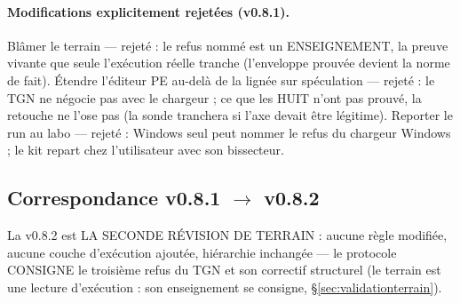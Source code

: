 \paragraph{Modifications explicitement rejetées (v0.8.1).} Blâmer le terrain —
rejeté : le refus nommé est un ENSEIGNEMENT, la preuve vivante que seule
l'exécution réelle tranche (l'enveloppe prouvée devient la norme de fait).
Étendre l'éditeur PE au-delà de la lignée sur spéculation — rejeté : le TGN ne
négocie pas avec le chargeur ; ce que les HUIT n'ont pas prouvé, la retouche ne
l'ose pas (la sonde tranchera si l'axe devait être légitime). Reporter le run au
labo — rejeté : Windows seul peut nommer le refus du chargeur Windows ; le kit
repart chez l'utilisateur avec son bissecteur.

\subsection{Correspondance v0.8.1 $\to$ v0.8.2}\label{sec:evolutions082}

La v0.8.2 est LA SECONDE RÉVISION DE TERRAIN : aucune règle modifiée, aucune
couche d'exécution ajoutée, hiérarchie inchangée — le protocole CONSIGNE le
troisième refus du TGN et son correctif structurel (le terrain est une lecture
d'exécution : son enseignement se consigne, §\ref{sec:validationterrain}).

